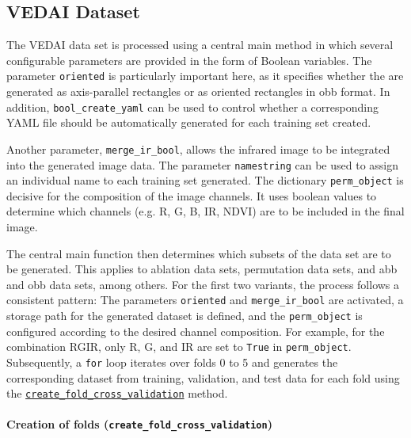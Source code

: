 \subsection{VEDAI Dataset}
\label{subsec:impl_VEDAI}


The \acrshort{VEDAI} data set is processed using a central main method in which several configurable parameters are provided in the form of Boolean variables. The parameter \lstinline|oriented| is particularly important here, as it specifies whether the  are generated as axis-parallel rectangles or as oriented rectangles in \acrshort{obb} format. In addition, \lstinline|bool_create_yaml| can be used to control whether a corresponding \acrshort{YAML} file should be automatically generated for each training set created.

Another parameter, \lstinline|merge_ir_bool|, allows the infrared image to be integrated into the generated image data. The parameter \lstinline|namestring| can be used to assign an individual name to each training set generated. The dictionary \lstinline|perm_object| is decisive for the composition of the image channels. It uses boolean values to determine which channels (e.g. \acrshort{R}, \acrshort{G}, \acrshort{B}, \acrshort{IR}, \acrshort{NDVI}) are to be included in the final image.

The central main function then determines which subsets of the data set are to be generated. This applies to ablation data sets, permutation data sets, and \acrshort{abb} and \acrshort{obb} data sets, among others. For the first two variants, the process follows a consistent pattern: The parameters \lstinline|oriented| and \lstinline|merge_ir_bool| are activated, a storage path for the generated dataset is defined, and the \lstinline|perm_object| is configured according to the desired channel composition. For example, for the combination \acrshort{RGIR}, only \acrshort{R}, \acrshort{G}, and \acrshort{IR} are set to \lstinline|True| in \lstinline|perm_object|. Subsequently, a \texttt{for} loop iterates over folds 0 to 5 and generates the corresponding dataset from training, validation, and test data for each fold using the \hyperlink{par:create_fold_cv}{\lstinline|create_fold_cross_validation|} method.

\paragraph{Creation of folds (\lstinline|create_fold_cross_validation|)}
\hypertarget{par:create_fold_cv}{}

